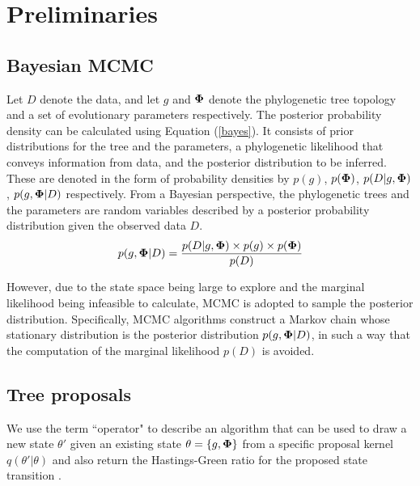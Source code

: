 \documentclass{bmcart}
\begin{document}
\section*{Preliminaries}
\subsection*{Bayesian MCMC}
Let $D$ denote the data, and let $g$ and $\bf{\Phi}$ denote the phylogenetic tree topology and a set of evolutionary parameters respectively. The posterior probability density can be calculated using Equation (\ref{bayes}). It consists of prior distributions for the  tree and the parameters, a phylogenetic likelihood that conveys information from data, and the posterior distribution to be inferred. These are denoted in the form of probability densities by $p(g) $, $p(\bf{\Phi})$, $p(D|g,\bf{\Phi} )$, $p(g,{\bf{\Phi}}|D)$ respectively. From a Bayesian perspective, the phylogenetic trees and the parameters are random variables described by a posterior probability distribution given the observed data $D$.
\begin{equation}\label{bayes}
p(g,{\bf{\Phi}} |D) = \frac{{p (D|g,{\bf{\Phi}} ) \times p (g) \times p ({\bf{\Phi}} )}}{{p (D)}}
\end{equation}

However, due to the state space being large to explore and the marginal likelihood being infeasible to calculate, MCMC is adopted to sample the posterior distribution. Specifically, MCMC algorithms construct a Markov chain whose stationary distribution is the posterior distribution $p(g,{\bf{\Phi}} |D)$, in such a way that the computation of the marginal likelihood $p (D)$ is avoided.
\subsection*{Tree proposals}
\label{treeproposals}
We use the term ``operator" to describe an algorithm that can be used to draw a new state $\theta'$ given an existing state $\theta = \{g,{\bf{\Phi}}\}$ from a specific proposal kernel $q(\theta'|\theta)$ and also return the Hastings-Green ratio for the proposed state transition \cite{hastings1970monte,green1995reversible}.
\end{document}
